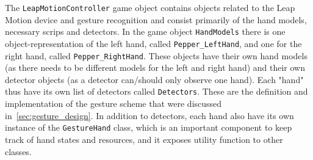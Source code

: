 The \texttt{LeapMotionController} game object contains objects related to the Leap Motion device and gesture recognition and consist primarily of the hand models, necessary 
scrips and detectors. In the game object \texttt{HandModels} there is one object-representation of the left hand, called \texttt{Pepper\_LeftHand}, and one for the 
right hand, called \texttt{Pepper\_RightHand}. These objects have their own hand models (as there needs to be different models for the left and right hand) and their 
own detector objects (as a detector can/should only observe one hand). Each "hand" thus have its own list of detectors called \texttt{Detectors}. 
These are the definition and implementation of the gesture scheme that were discussed in~\vref{sec:gesture_design}. In addition to detectors, each
hand also have its own instance of the \texttt{GestureHand} class, which is an important component to keep track of hand states and resources, and
it exposes utility function to other classes. 